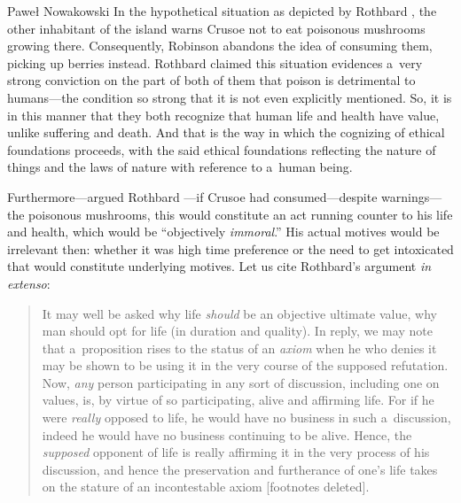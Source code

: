 \begin{artengenv}{Paweł Nowakowski}
In the hypothetical situation as depicted by Rothbard 
\parencite*[][p.32]{Rothbard1998Ethics}, %
 the other inhabitant of the island warns Crusoe not to eat poisonous mushrooms growing there. Consequently, Robinson abandons the idea of consuming them, picking up berries instead. Rothbard claimed this situation evidences a~very strong conviction on the part of both of them that poison is detrimental to humans---the condition so strong that it is not even explicitly mentioned. So, it is in this manner that they both recognize that human life and health have value, unlike suffering and death. And that is the way in which the cognizing of ethical foundations proceeds, with the said ethical foundations reflecting the nature of things and the laws of nature with reference to a~human being.



Furthermore---argued Rothbard 
\parencite*[][pp.32–33]{Rothbard1998Ethics}%
---if Crusoe had consumed---despite warnings---the poisonous mushrooms, this would constitute an act running counter to his life and health, which would be ``objectively \textit{immoral}.'' His actual motives would be irrelevant then: whether it was high time preference or the need to get intoxicated that would constitute underlying motives. Let us cite Rothbard's 
\parencite*[][pp.32–33]{Rothbard1998Ethics} %
 argument \textit{in extenso}:



\begin{quote}
It may well be asked why life \textit{should} be an objective ultimate value, why man should opt for life (in duration and quality). In reply, we may note that a~proposition rises to the status of an \textit{axiom} when he who denies it may be shown to be using it in the very course of the supposed refutation. Now, \textit{any} person participating in any sort of discussion, including one on values, is, by virtue of so participating, alive and affirming life. For if he were \textit{really} opposed to life, he would have no business in such a~discussion, indeed he would have no business continuing to be alive. Hence, the \textit{supposed} opponent of life is really affirming it in the very process of his discussion, and hence the preservation and furtherance of one's life takes on the stature of an incontestable axiom [footnotes deleted].
\end{quote}




\end{artengenv}
